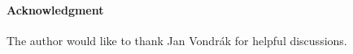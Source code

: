 \documentclass[letterpaper,11pt]{article}
\theoremstyle{definition}
\begin{document}
\paragraph{Acknowledgment} The author would like to thank Jan Vondr\'ak for helpful discussions.



\end{document}
